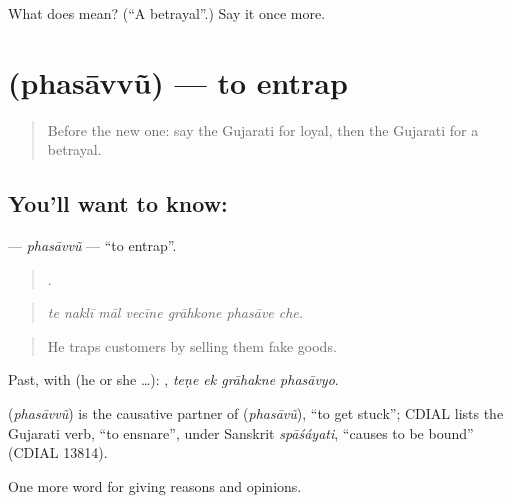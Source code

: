 \begin{tcolorbox}[breakable,colback=teal!4,colframe=teal!35!black,title={Before you move on}]
What does  mean? (\textquotedblleft{}A betrayal\textquotedblright{}.) Say it once more.
\end{tcolorbox}
\section[\texorpdfstring{\gu{ફસાવવું} (phasāvvũ)}{ફસાવવું (phasāvvũ)}]{ (phasāvvũ) — to entrap}

\label{lesson:GU-C360-phasavvu}



\begin{quote}
Before the new one: say the Gujarati for loyal, then the Gujarati for a betrayal.
\end{quote}

\subsection*{You'll want to know: }
\textbf{} — \emph{phasāvvũ} — \textquotedblleft{}to entrap\textquotedblright{}.

\begin{quote}
      .
\end{quote}

\begin{quote}
\emph{te naklī māl vecīne grāhkone phasāve che.}
\end{quote}

\begin{quote}
He traps customers by selling them fake goods.
\end{quote}

Past, with  (he or she …):    , \emph{teṇe ek grāhakne phasāvyo}.

\begin{cousinweb}
\textbf{} (\emph{phasāvvũ}) is the causative partner of \textbf{} (\emph{phasāvũ}), \textquotedblleft{}to get stuck\textquotedblright{}; CDIAL lists the Gujarati verb, \textquotedblleft{}to ensnare\textquotedblright{}, under Sanskrit \emph{spāśáyati}, \textquotedblleft{}causes to be bound\textquotedblright{} (CDIAL 13814).
\end{cousinweb}

\begin{grammarlens}[title={What you've built}]
One more word for giving reasons and opinions.
\end{grammarlens}


